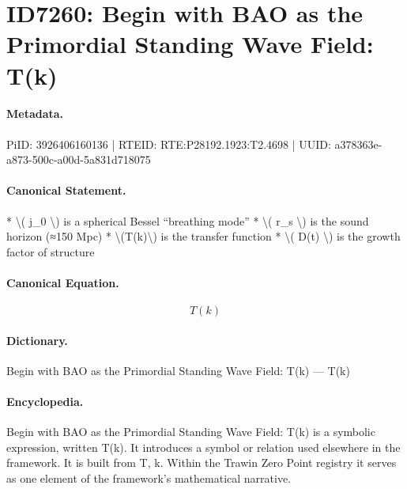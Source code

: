 \section*{ID7260: Begin with BAO as the Primordial Standing Wave Field: T(k)}
\paragraph{Metadata.}
PiID: 3926406160136 | RTEID: RTE:P28192.1923:T2.4698 | UUID: a378363e-a873-500c-a00d-5a831d718075

\paragraph{Canonical Statement.}
* \textbackslash{}( j\_0 \textbackslash{}) is a spherical Bessel “breathing mode” * \textbackslash{}( r\_s \textbackslash{}) is the sound horizon (≈150 Mpc) * \textbackslash{}(T(k)\textbackslash{}) is the transfer function * \textbackslash{}( D(t) \textbackslash{}) is the growth factor of structure

\paragraph{Canonical Equation.}
\[
T(k)
\]

\paragraph{Dictionary.}
Begin with BAO as the Primordial Standing Wave Field: T(k) — T(k)

\paragraph{Encyclopedia.}
Begin with BAO as the Primordial Standing Wave Field: T(k) is a symbolic expression, written T(k). It introduces a symbol or relation used elsewhere in the framework. It is built from T, k. Within the Trawin Zero Point registry it serves as one element of the framework's mathematical narrative.
